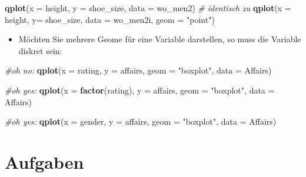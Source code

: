 \documentclass[12pt,ngerman,]{book}
\makeatletter
\newenvironment{Shaded}{\begin{snugshade}}{\end{snugshade}}
\newcommand{\KeywordTok}[1]{\textcolor[rgb]{0.13,0.29,0.53}{\textbf{{#1}}}}
\newcommand{\DataTypeTok}[1]{\textcolor[rgb]{0.13,0.29,0.53}{{#1}}}
\newcommand{\StringTok}[1]{\textcolor[rgb]{0.31,0.60,0.02}{{#1}}}
\newcommand{\CommentTok}[1]{\textcolor[rgb]{0.56,0.35,0.01}{\textit{{#1}}}}
\newcommand{\NormalTok}[1]{{#1}}
\providecommand{\tightlist}{%
  \setlength{\itemsep}{0pt}\setlength{\parskip}{0pt}}
\newenvironment{kframe}{%
\medskip{}
\setlength{\fboxsep}{.8em}
 \def\at@end@of@kframe{}%
 \ifinner\ifhmode%
  \def\at@end@of@kframe{\end{minipage}}%
  \begin{minipage}{\columnwidth}%
 \fi\fi%
 \def\FrameCommand##1{\hskip\@totalleftmargin \hskip-\fboxsep
 \colorbox{shadecolor}{##1}\hskip-\fboxsep
     \hskip-\linewidth \hskip-\@totalleftmargin \hskip\columnwidth}%
 \MakeFramed {\advance\hsize-\width
   \@totalleftmargin\z@ \linewidth\hsize
   \@setminipage}}%
 {\par\unskip\endMakeFramed%
 \at@end@of@kframe}
\renewenvironment{Shaded}{\begin{kframe}}{\end{kframe}}
\makeatother
\begin{document}
\begin{Shaded}
\begin{Highlighting}[]
\KeywordTok{qplot}\NormalTok{(}\DataTypeTok{x =} \NormalTok{height, }\DataTypeTok{y =} \NormalTok{shoe_size, }\DataTypeTok{data =} \NormalTok{wo_men2)  }\CommentTok{# identisch zu}
\KeywordTok{qplot}\NormalTok{(}\DataTypeTok{x =} \NormalTok{height, }\DataTypeTok{y=}  \NormalTok{shoe_size, }\DataTypeTok{data =} \NormalTok{wo_men2i, }\DataTypeTok{geom =} \StringTok{"point"}\NormalTok{)}
\end{Highlighting}
\end{Shaded}

\begin{itemize}
\tightlist
\item
  Möchten Sie mehrere Geome für eine Variable darstellen, so muss die
  Variable diskret sein:
\end{itemize}

\begin{Shaded}
\begin{Highlighting}[]
\CommentTok{#oh no: }
\KeywordTok{qplot}\NormalTok{(}\DataTypeTok{x =} \NormalTok{rating, }\DataTypeTok{y =} \NormalTok{affairs, }\DataTypeTok{geom =} \StringTok{"boxplot"}\NormalTok{, }\DataTypeTok{data =} \NormalTok{Affairs)}

\CommentTok{#oh yes: }
\KeywordTok{qplot}\NormalTok{(}\DataTypeTok{x =} \KeywordTok{factor}\NormalTok{(rating), }\DataTypeTok{y =} \NormalTok{affairs, }\DataTypeTok{geom =} \StringTok{"boxplot"}\NormalTok{, }\DataTypeTok{data =} \NormalTok{Affairs)}

\CommentTok{#oh yes: }
\KeywordTok{qplot}\NormalTok{(}\DataTypeTok{x =} \NormalTok{gender, }\DataTypeTok{y =} \NormalTok{affairs, }\DataTypeTok{geom =} \StringTok{"boxplot"}\NormalTok{, }\DataTypeTok{data =} \NormalTok{Affairs)}
\end{Highlighting}
\end{Shaded}

\section{Aufgaben}\label{aufgaben-10}
\end{document}
